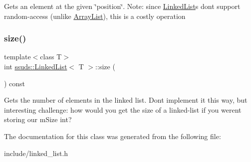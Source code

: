 Gets an element at the given \char`\"{}position\char`\"{}. Note\+: since \mbox{\hyperlink{classssuds_1_1_linked_list}{Linked\+List}}\textquotesingle{}s don\textquotesingle{}t support random-\/access (unlike \mbox{\hyperlink{classssuds_1_1_array_list}{Array\+List}}), this is a costly operation \mbox{\label{classssuds_1_1_linked_list_adb7155ceb5a5da5551cb080e3c229195}} 
\subsubsection{\texorpdfstring{size()}{size()}}
{\footnotesize\ttfamily template$<$class T$>$ \\
int \mbox{\hyperlink{classssuds_1_1_linked_list}{ssuds\+::\+Linked\+List}}$<$ T $>$\+::size (\begin{DoxyParamCaption}{ }\end{DoxyParamCaption}) const\hspace{0.3cm}{\ttfamily [inline]}}

Gets the number of elements in the linked list. Don\textquotesingle{}t implement it this way, but interesting challenge\+: how would you get the size of a linked-\/list if you weren\textquotesingle{}t storing our m\+Size int? 

The documentation for this class was generated from the following file\+:\begin{DoxyCompactItemize}
\item 
include/linked\+\_\+list.\+h\end{DoxyCompactItemize}
